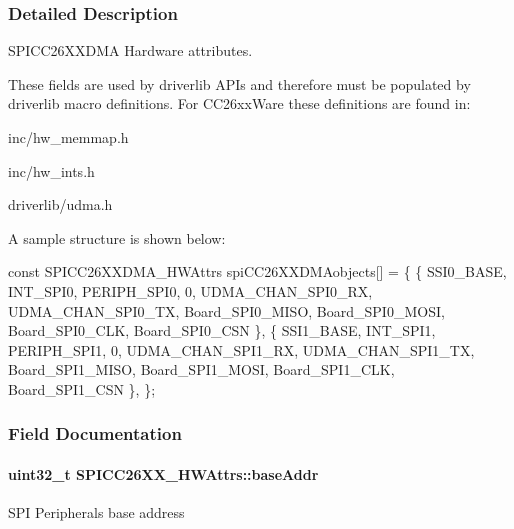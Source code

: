 \subsubsection{Detailed Description}
S\+P\+I\+C\+C26\+X\+X\+D\+M\+A Hardware attributes. 

These fields are used by driverlib A\+P\+Is and therefore must be populated by driverlib macro definitions. For C\+C26xx\+Ware these definitions are found in\+:
\begin{DoxyItemize}
\item inc/hw\+\_\+memmap.\+h
\item inc/hw\+\_\+ints.\+h
\item driverlib/udma.\+h
\end{DoxyItemize}

A sample structure is shown below\+: 
\begin{DoxyCode}
\textcolor{keyword}{const} SPICC26XXDMA\_HWAttrs spiCC26XXDMAobjects[] = \{
    \{
        SSI0\_BASE,
        INT\_SPI0,
        PERIPH\_SPI0,
        0,
        UDMA\_CHAN\_SPI0\_RX,
        UDMA\_CHAN\_SPI0\_TX,
        Board\_SPI0\_MISO,
        Board\_SPI0\_MOSI,
        Board\_SPI0\_CLK,
        Board\_SPI0\_CSN
    \},
    \{
        SSI1\_BASE,
        INT\_SPI1,
        PERIPH\_SPI1,
        0,
        UDMA\_CHAN\_SPI1\_RX,
        UDMA\_CHAN\_SPI1\_TX,
        Board\_SPI1\_MISO,
        Board\_SPI1\_MOSI,
        Board\_SPI1\_CLK,
        Board\_SPI1\_CSN
    \},
\};
\end{DoxyCode}
 

\subsubsection{Field Documentation}
\paragraph[{base\+Addr}]{\setlength{\rightskip}{0pt plus 5cm}uint32\+\_\+t S\+P\+I\+C\+C26\+X\+X\+\_\+\+H\+W\+Attrs\+::base\+Addr}\label{struct_s_p_i_c_c26_x_x___h_w_attrs_a7e7cb3e32890a0b812a4c0bf989506a1}
S\+P\+I Peripheral\textquotesingle{}s base address 

